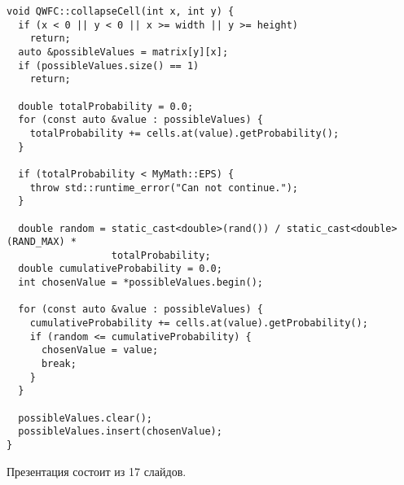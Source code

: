 \begin{lstlisting}[caption={Метод фиксирования состояния ячейки класса QWFC}, label={lst:qwfcoll}]
void QWFC::collapseCell(int x, int y) {
  if (x < 0 || y < 0 || x >= width || y >= height)
    return;
  auto &possibleValues = matrix[y][x];
  if (possibleValues.size() == 1)
    return;

  double totalProbability = 0.0;
  for (const auto &value : possibleValues) {
    totalProbability += cells.at(value).getProbability();
  }

  if (totalProbability < MyMath::EPS) {
    throw std::runtime_error("Can not continue.");
  }

  double random = static_cast<double>(rand()) / static_cast<double>(RAND_MAX) *
                  totalProbability;
  double cumulativeProbability = 0.0;
  int chosenValue = *possibleValues.begin();

  for (const auto &value : possibleValues) {
    cumulativeProbability += cells.at(value).getProbability();
    if (random <= cumulativeProbability) {
      chosenValue = value;
      break;
    }
  }

  possibleValues.clear();
  possibleValues.insert(chosenValue);
}
\end{lstlisting}

\newpage

\renewcommand\thechapter{B}


Презентация состоит из 17 слайдов.